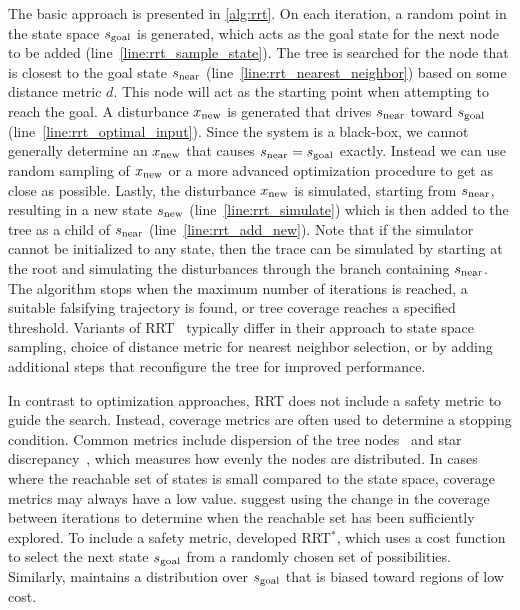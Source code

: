 The basic approach is presented in \cref{alg:rrt}. On each iteration, a random point in the state space $s_{\rm goal}$ is generated, which acts as the goal state for the next node to be added (line~\ref{line:rrt_sample_state}). The tree is searched for the node that is closest to the goal state $s_{\rm near}$ (line~\ref{line:rrt_nearest_neighbor}) based on some distance metric $d$.  This node will act as the starting point when attempting to reach the goal. A disturbance $x_{\rm new}$ is generated that drives $s_{\rm near}$ toward $s_{\rm goal}$ (line~\ref{line:rrt_optimal_input}). Since the system is a black-box, we cannot generally determine an $x_{\rm new}$ that causes $s_{\rm near} = s_{\rm goal}$ exactly. Instead we can use random sampling of $x_{\rm new}$ or a more advanced optimization procedure to get as close as possible. Lastly, the disturbance $x_{\rm new}$ is simulated, starting from $s_{\rm near}$, resulting in a new state $s_{\rm new}$ (line~\ref{line:rrt_simulate}) which is then added to the tree as a child of $s_{\rm near}$ (line~\ref{line:rrt_add_new}). Note that if the simulator cannot be initialized to any state, then the trace can be simulated by starting at the root and simulating the disturbances through the branch containing $s_{\rm near}$. The algorithm stops when the maximum number of iterations is reached, a suitable falsifying trajectory is found, or tree coverage reaches a specified threshold. Variants of RRT~\cite{esposito2004adaptive,kim2005rrt,branicky2006sampling,dang2008sensitive,Nahhal2007Test,dreossi2015efficient,tuncali2019rapidly,koschi2019computationally} typically differ in their approach to state space sampling, choice of distance metric for nearest neighbor selection, or by adding additional steps that reconfigure the tree for improved performance.

In contrast to optimization approaches, RRT does not include a safety metric to guide the search. Instead, coverage metrics are often used to determine a stopping condition. Common metrics include dispersion of the tree nodes~\cite{esposito2004adaptive} and star discrepancy~\cite{Nahhal2007Test,dang2008sensitive,dreossi2015efficient}, which measures how evenly the nodes are distributed. In cases where the reachable set of states is small compared to the state space, coverage metrics may always have a low value. \textcite{esposito2004adaptive} suggest using the change in the coverage between iterations to determine when the reachable set has been sufficiently explored. To include a safety metric, \textcite{karaman2011sampling} developed RRT$^*$, which uses a cost function to select the next state $s_{\rm goal}$ from a randomly chosen set of possibilities. Similarly, \textcite{kim2005rrt} maintains a distribution over $s_{\rm goal}$ that is biased toward regions of low cost. 

